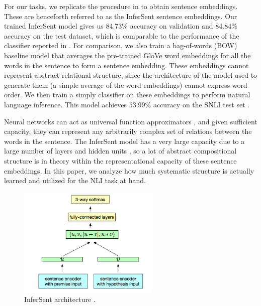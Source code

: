 For our tasks, we replicate the procedure in \citet{Conneau:2017uf} to obtain sentence embeddings. These are henceforth referred to as the InferSent sentence embeddings. Our trained InferSent model gives us 84.73\% accuracy on validation and 84.84\% accuracy on the test dataset, which is comparable to the performance of the classifier reported in \citet{Conneau:2017uf}. For comparison, we also train a bag-of-words (BOW) baseline model that averages the pre-trained GloVe word embeddings for all the words in the sentence to form a sentence embedding. These embeddings cannot represent abstract relational structure, since the architecture of the model used to generate them (a simple average of the word embeddings) cannot express word order. We then train a simply classifier on these embeddings to perform natural language inference. This model achieves $53.99\%$ accuracy on the SNLI test set \citep[comparable to the BOW performance reported in][]{Conneau:2017uf}.

Neural networks can act as universal function approximators \citep{siegelmann1995computational, hornik1991approximation}, and given sufficient capacity, they can represent any arbitrarily complex set of relations between the words in the sentence. The InferSent model has a very large capacity due to a large number of layers and hidden units \citep[see][]{Conneau:2017uf}, so a lot of abstract compositional structure is in theory within the representational capacity of these sentence embeddings. In this paper, we analyze how much systematic structure is actually learned and utilized for the NLI task at hand.


\begin{figure}
\centering
\includegraphics[width=0.6\textwidth]{figures/InferSent_arch.png}
\caption{InferSent architecture \citep{Conneau:2017uf}.}
\label{fig:arch}
\end{figure}

